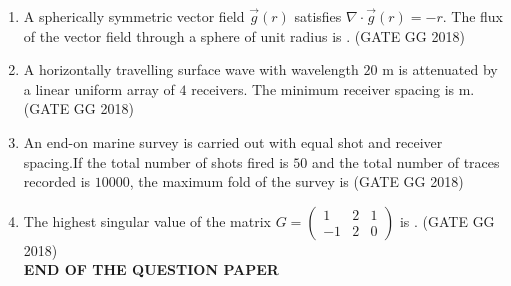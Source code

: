 \documentclass[journal]{IEEEtran}
\begin{document}
\begin{enumerate}[start=1]
 \item A spherically symmetric vector field $\vec{g}(r)$ satisfies $\nabla \cdot \vec{g}(r) = -r$. The flux of the vector field through a sphere of unit radius is \makebox[2cm]{\hrulefill} .
 \hfill(GATE GG 2018)
 \vspace{0.5cm}

 \item A horizontally travelling surface wave with wavelength $20$ m is attenuated by a linear uniform array of $4$ receivers. The minimum receiver spacing is \makebox[2cm]{\hrulefill}  m.
 \hfill(GATE GG 2018)
 \vspace{0.5cm}
 
\item An end-on marine survey is carried out with equal shot and receiver spacing.If the total number of shots fired is $50$ and the total number of traces recorded is $10000$, the maximum fold of the survey is \makebox[2cm]{\hrulefill}
\hfill(GATE GG 2018)
\vspace{0.5cm}

\item The highest singular value of the matrix $G=\begin{pmatrix} 1 & 2 &1 \\ -1 & 2 & 0 \end{pmatrix}$ is \makebox[2cm]{\hrulefill}.
\hfill(GATE GG 2018)\\

\textbf{END OF THE QUESTION PAPER}
    \end{enumerate}
\end{document}

